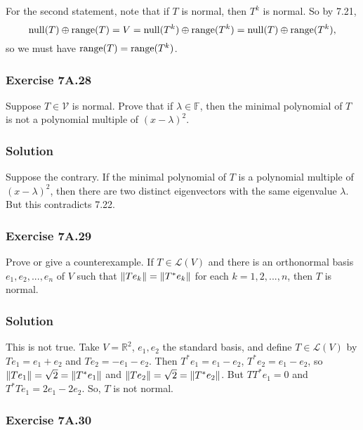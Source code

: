 For the second statement, note that if $T$ is normal, then $T^k$ is normal.
So by 7.21,
\begin{equation*}
    \mathrm{null}(T) \oplus \mathrm{range}(T) = V = \mathrm{null}(T^k) \oplus \mathrm{range}(T^k) = \mathrm{null}(T) \oplus \mathrm{range}(T^k),
\end{equation*}
so we must have $\mathrm{range}(T) = \mathrm{range}(T^k)$.


\subsubsection*{Exercise 7A.28}

Suppose $T \in \mathcal{V}$ is normal.
Prove that if $\lambda \in \mathbb{F}$, then the minimal polynomial of $T$ is not a polynomial multiple of $(x - \lambda)^2$.

\subsubsection*{Solution}

Suppose the contrary.
If the minimal polynomial of $T$ is a polynomial multiple of $(x - \lambda)^2$, then there are two distinct eigenvectors with the same eigenvalue $\lambda$.
But this contradicts 7.22.


\subsubsection*{Exercise 7A.29}

Prove or give a counterexample.
If $T \in \mathcal{L}(V)$ and there is an orthonormal basis $e_1, e_2, ..., e_n$ of $V$ such that $\left\lVert Te_k\right\rVert = \left\lVert T^*e_k\right\rVert$ for each $k = 1, 2, ..., n$, then $T$ is normal.

\subsubsection*{Solution}

This is not true.
Take $V = \mathbb{R}^2$, $e_1, e_2$ the standard basis, and define $T \in \mathcal{L}(V)$ by $Te_1 = e_1 + e_2$ and $Te_2 = -e_1 - e_2$.
Then $T^*e_1 = e_1 - e_2$, $T^*e_2 = e_1 - e_2$, so $\left\lVert Te_1\right\rVert = \sqrt{2} = \left\lVert T^*e_1\right\rVert$ and $\left\lVert Te_2\right\rVert = \sqrt{2} = \left\lVert T^*e_2\right\rVert$.
But $TT^*e_1 = 0$ and $T^*Te_1 = 2e_1 - 2e_2$.
So, $T$ is not normal.


\subsubsection*{Exercise 7A.30}

